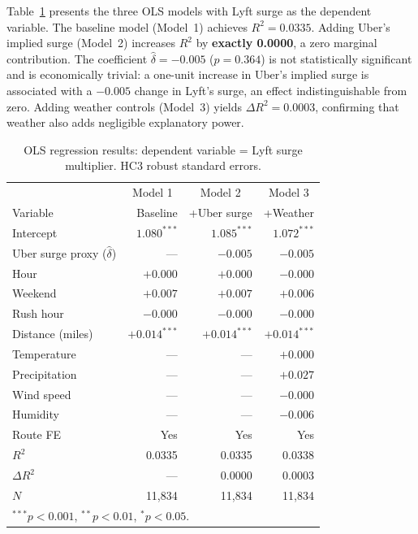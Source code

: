 \documentclass[11pt, letterpaper]{article}
\begin{document}
Table~\ref{tab:ols} presents the three OLS models with Lyft surge as
the dependent variable. The baseline model (Model~1) achieves
$R^2 = 0.0335$. Adding Uber's implied surge (Model~2) increases $R^2$
by \textbf{exactly 0.0000}, a zero marginal contribution. The
coefficient $\hat{\delta} = -0.005$ ($p = 0.364$) is not statistically
significant and is economically trivial: a one-unit increase in Uber's
implied surge is associated with a $-0.005$ change in Lyft's surge,
an effect indistinguishable from zero. Adding weather controls
(Model~3) yields $\Delta R^2 = 0.0003$, confirming that weather also
adds negligible explanatory power.

\begin{table}[H]
  \centering
  \caption{OLS regression results: dependent variable = Lyft surge
           multiplier. HC3 robust standard errors.}
  \label{tab:ols}
  \begin{tabular}{lrrr}
    \toprule
    & \multicolumn{1}{c}{Model 1} & \multicolumn{1}{c}{Model 2} &
      \multicolumn{1}{c}{Model 3} \\
    Variable & Baseline & +Uber surge & +Weather \\
    \midrule
    Intercept                            & $1.080^{***}$ & $1.085^{***}$ & $1.072^{***}$ \\
    Uber surge proxy ($\hat{\delta}$)    & ---           & $-0.005$      & $-0.005$ \\
    Hour                                 & $+0.000$      & $+0.000$      & $-0.000$ \\
    Weekend                              & $+0.007$      & $+0.007$      & $+0.006$ \\
    Rush hour                            & $-0.000$      & $-0.000$      & $-0.000$ \\
    Distance (miles)                     & $+0.014^{***}$& $+0.014^{***}$& $+0.014^{***}$ \\
    Temperature                          & ---           & ---           & $+0.000$ \\
    Precipitation                        & ---           & ---           & $+0.027$ \\
    Wind speed                           & ---           & ---           & $-0.000$ \\
    Humidity                             & ---           & ---           & $-0.006$ \\
    Route FE                             & Yes           & Yes           & Yes \\
    \midrule
    $R^2$                                & 0.0335        & 0.0335        & 0.0338 \\
    $\Delta R^2$                         & ---           & 0.0000        & 0.0003 \\
    $N$                                  & 11,834        & 11,834        & 11,834 \\
    \bottomrule
    \multicolumn{4}{l}{\footnotesize $^{***}p<0.001$, $^{**}p<0.01$,
    $^{*}p<0.05$.}
  \end{tabular}
\end{table}
\end{document}
